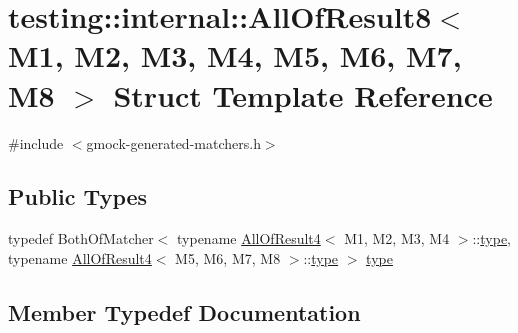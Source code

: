 \hypertarget{structtesting_1_1internal_1_1_all_of_result8}{}\section{testing\+::internal\+::All\+Of\+Result8$<$ M1, M2, M3, M4, M5, M6, M7, M8 $>$ Struct Template Reference}
\label{structtesting_1_1internal_1_1_all_of_result8}


{\ttfamily \#include $<$gmock-\/generated-\/matchers.\+h$>$}

\subsection*{Public Types}
\begin{DoxyCompactItemize}
\item 
typedef Both\+Of\+Matcher$<$ typename \mbox{\hyperlink{structtesting_1_1internal_1_1_all_of_result4}{All\+Of\+Result4}}$<$ M1, M2, M3, M4 $>$\+::\mbox{\hyperlink{structtesting_1_1internal_1_1_all_of_result8_a7103892a28c35221b9e62e871c577727}{type}}, typename \mbox{\hyperlink{structtesting_1_1internal_1_1_all_of_result4}{All\+Of\+Result4}}$<$ M5, M6, M7, M8 $>$\+::\mbox{\hyperlink{structtesting_1_1internal_1_1_all_of_result8_a7103892a28c35221b9e62e871c577727}{type}} $>$ \mbox{\hyperlink{structtesting_1_1internal_1_1_all_of_result8_a7103892a28c35221b9e62e871c577727}{type}}
\end{DoxyCompactItemize}


\subsection{Member Typedef Documentation}
\mbox{\label{structtesting_1_1internal_1_1_all_of_result8_a7103892a28c35221b9e62e871c577727}} 
